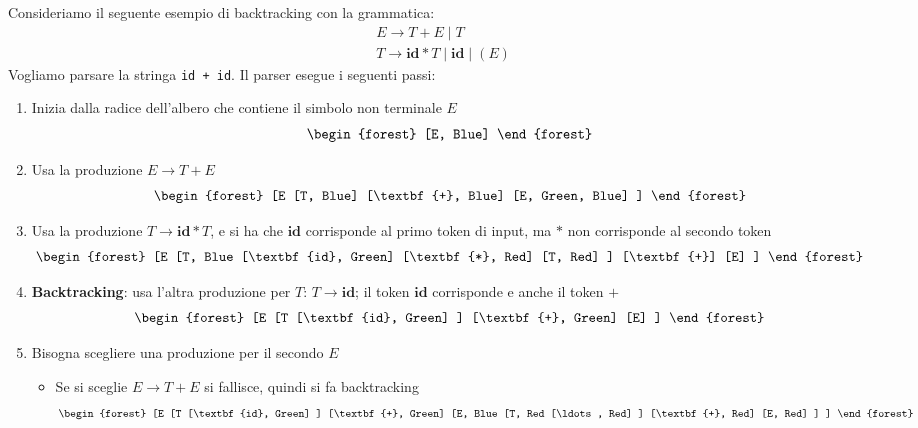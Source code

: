 \documentclass[a4paper]{article}
\begin{document}
\begin{example}
  Consideriamo il seguente esempio di backtracking con la grammatica:
  \[
    \begin{aligned}
      &E \to T + E \mid T \\
      &T \to \textbf{id} * T \mid \textbf{id} \mid (E)
    \end{aligned}
  \] 
  Vogliamo parsare la stringa \texttt{id + id}. Il parser esegue i seguenti passi:
  \begin{enumerate}
    \item Inizia dalla radice dell'albero che contiene il simbolo non terminale \( E \)
      \[
        \begin{forest}
          [E, Blue]
        \end{forest}
      \] 

    \item Usa la produzione \( E \to T + E \)
      \[
        \begin{forest}
          [E
            [T, Blue]
            [\textbf{+}, Blue]
            [E, Green, Blue]
          ]
        \end{forest}
      \] 

    \item Usa la produzione \( T \to \textbf{id} * T \), e si ha che \( \textbf{id} \)
      corrisponde al primo token di input, ma \( * \) non corrisponde al secondo token
      \[
        \begin{forest}
          [E
            [T, Blue
              [\textbf{id}, Green]
              [\textbf{*}, Red]
              [T, Red]
            ]
            [\textbf{+}]
            [E]
          ]
        \end{forest}
      \] 

    \item \textbf{Backtracking}: usa l'altra produzione per
      \( T \): \( T \to \textbf{id} \); il token \( \textbf{id} \) corrisponde e anche
      il token \( + \)
      \[
        \begin{forest}
          [E
            [T
              [\textbf{id}, Green]
            ]
            [\textbf{+}, Green]
            [E]
          ]
        \end{forest}
      \] 

    \item Bisogna scegliere una produzione per il secondo \( E \)
      \begin{itemize}
        \item Se si sceglie \( E \to T + E \) si fallisce, quindi si fa backtracking
        \[
          \begin{forest}
            [E
              [T
                [\textbf{id}, Green]
              ]
              [\textbf{+}, Green]
              [E, Blue
                [T, Red
                  [\ldots, Red]
                ]
                [\textbf{+}, Red]
                [E, Red]
              ]
            ]
          \end{forest}
        \] 


\end{itemize}
\end{enumerate}
\end{example}
\end{document}
